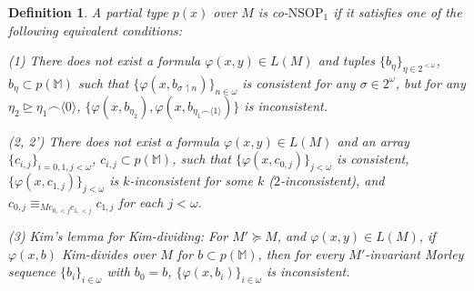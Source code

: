 \documentclass[12pt]{amsart}
\newtheorem{definition}{Definition}[section]
\theoremstyle{definition}
\begin{document}
\begin{definition}\label{4-consop1}
A partial type $p(x)$ over $M$ is \textit{co-$\mathrm{NSOP}_{1}$} if it satisfies one of the following equivalent conditions:

(1) There does not exist a formula $\varphi(x, y) \in L(M)$ and tuples $\{b_{\eta}\}_{\eta \in 2^{<\omega}}$, $b_{\eta} \subset p(\mathbb{M})$ such that $\{\varphi(x, b_{\sigma \upharpoonleft n})\}_{n \in \omega}$ is consistent for any $\sigma \in 2^{\omega}$, but for any $\eta_{2} \unrhd \eta_{1} \smallfrown \langle 0\rangle$, $\{\varphi(x, b_{\eta_{2}}), \varphi(x, b_{\eta_{1} \smallfrown \langle 1\rangle})\}$ is inconsistent.

(2, 2') There does not exist a formula $\varphi(x, y) \in L(M)$ and an array $\{c_{i, j}\}_{i = 0, 1, j< \omega}$, $c_{i, j} \subset p(\mathbb{M})$, such that $\{\varphi(x, c_{0, j})\}_{j < \omega}$ is consistent, $\{\varphi(x, c_{1, j})\}_{j < \omega}$ is $k$-inconsistent for some $k$ ($2$-inconsistent), and $c_{0, j} \equiv_{Mc_{0, < j}c_{1, < j}} c_{1, j}$ for each $j < \omega$.

(3) Kim's lemma for Kim-dividing: For $M' \succeq M$, and $\varphi(x, y) \in L(M)$, if $\varphi(x, b)$ Kim-divides over $M$ for $b \subset p(\mathbb{M})$, then for every $M'$-invariant Morley sequence $\{b_{i}\}_{i \in \omega}$ with $b_{0}=b$, $\{\varphi(x, b_{i})\}_{i \in \omega}$ is inconsistent.

\end{definition}
\end{document}
